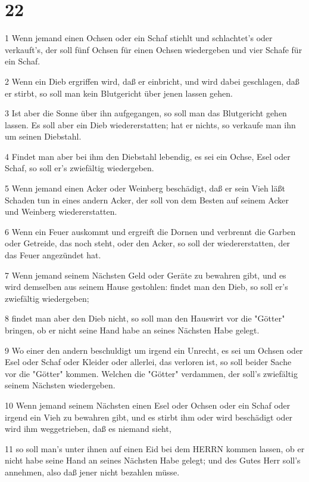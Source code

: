 \chapter{22}

\par 1 Wenn jemand einen Ochsen oder ein Schaf stiehlt und schlachtet's oder verkauft's, der soll fünf Ochsen für einen Ochsen wiedergeben und vier Schafe für ein Schaf.
\par 2 Wenn ein Dieb ergriffen wird, daß er einbricht, und wird dabei geschlagen, daß er stirbt, so soll man kein Blutgericht über jenen lassen gehen.
\par 3 Ist aber die Sonne über ihn aufgegangen, so soll man das Blutgericht gehen lassen. Es soll aber ein Dieb wiedererstatten; hat er nichts, so verkaufe man ihn um seinen Diebstahl.
\par 4 Findet man aber bei ihm den Diebstahl lebendig, es sei ein Ochse, Esel oder Schaf, so soll er's zwiefältig wiedergeben.
\par 5 Wenn jemand einen Acker oder Weinberg beschädigt, daß er sein Vieh läßt Schaden tun in eines andern Acker, der soll von dem Besten auf seinem Acker und Weinberg wiedererstatten.
\par 6 Wenn ein Feuer auskommt und ergreift die Dornen und verbrennt die Garben oder Getreide, das noch steht, oder den Acker, so soll der wiedererstatten, der das Feuer angezündet hat.
\par 7 Wenn jemand seinem Nächsten Geld oder Geräte zu bewahren gibt, und es wird demselben aus seinem Hause gestohlen: findet man den Dieb, so soll er's zwiefältig wiedergeben;
\par 8 findet man aber den Dieb nicht, so soll man den Hauswirt vor die "Götter" bringen, ob er nicht seine Hand habe an seines Nächsten Habe gelegt.
\par 9 Wo einer den andern beschuldigt um irgend ein Unrecht, es sei um Ochsen oder Esel oder Schaf oder Kleider oder allerlei, das verloren ist, so soll beider Sache vor die "Götter" kommen. Welchen die "Götter" verdammen, der soll's zwiefältig seinem Nächsten wiedergeben.
\par 10 Wenn jemand seinem Nächsten einen Esel oder Ochsen oder ein Schaf oder irgend ein Vieh zu bewahren gibt, und es stirbt ihm oder wird beschädigt oder wird ihm weggetrieben, daß es niemand sieht,
\par 11 so soll man's unter ihnen auf einen Eid bei dem HERRN kommen lassen, ob er nicht habe seine Hand an seines Nächsten Habe gelegt; und des Gutes Herr soll's annehmen, also daß jener nicht bezahlen müsse.
